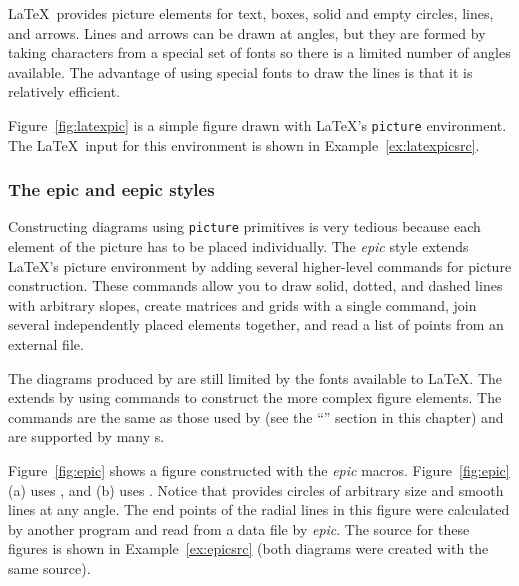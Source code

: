 \LaTeX\ provides picture elements for text, boxes, solid and empty
circles, lines, and arrows.  Lines and arrows can be drawn at angles,
but they are formed by taking characters from a special set of fonts
so there is a limited number of angles available.  The advantage
of using special fonts to draw the lines is that it is relatively efficient.

Figure~\ref{fig:latexpic} is a simple figure drawn with \LaTeX's
\verb|picture| environment.  The \LaTeX\ input for this environment is shown
in Example~\ref{ex:latexpicsrc}.  



\subsubsection{The epic and eepic styles}

Constructing diagrams using \verb|picture| primitives is very tedious
because each element of the picture has to be placed individually.
The \textit{epic} style extends \LaTeX's picture environment
by adding several higher-level commands for picture construction.
These commands allow you to draw solid, dotted, and dashed lines with 
arbitrary slopes, create matrices and grids with a single command,
join several independently placed elements together, and read a list
of points from an external file.  

The diagrams produced 
by  are still limited by
the fonts available 
to \LaTeX.  The  extends
 by using  commands to construct the
more complex figure elements.  The  commands are 
the same as those used by  (see the ``''
section in this chapter) and are supported by
many \dvidriver{}s.

Figure~\ref{fig:epic} shows
a figure constructed with the \textit{epic} macros.  
Figure~\ref{fig:epic} (a) uses , and (b) uses
.  Notice that  provides circles
of arbitrary size and smooth lines at any angle.  The
end points of the radial lines in this figure were calculated by
another program and read from a data file by \textit{epic}.  The
source for these figures is shown in Example~\ref{ex:epicsrc} (both diagrams
were created with the same source).

